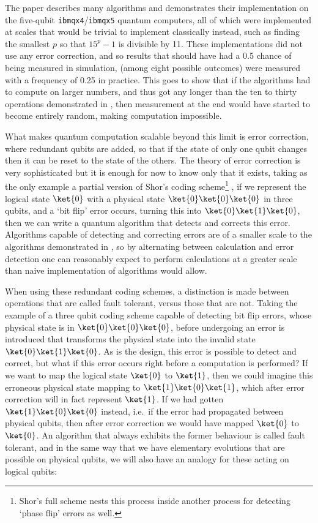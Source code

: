 The paper \cite{algos} describes many algorithms and demonstrates their implementation on the five-qubit \verb`ibmqx4`/\verb`ibmqx5` quantum computers, all of which were implemented at scales that would be trivial to implement classically instead, such as finding the smallest $p$ so that $15^p-1$ is divisible by 11. These implementations did not use any error correction, and so results that should have had a 0.5 chance of being measured in simulation, (among eight possible outcomes) were measured with a frequency of 0.25 in practice. This goes to show that if the algorithms had to compute on larger numbers, and thus got any longer than the ten to thirty operations demonstrated in \cite{algos}, then measurement at the end would have started to become entirely random, making computation impossible.

What makes quantum computation scalable beyond this limit is error correction, where redundant qubits are added, so that if the state of only one qubit changes then it can be reset to the state of the others. The theory of error correction is very sophisticated but it is enough for now to know only that it exists, taking as the only example a partial version of Shor's coding scheme\footnote{Shor's full scheme nests this process inside another process for detecting `phase flip' errors as well.} \cite{shor-encoding}, if we represent the logical state $\ket{0}$ with a physical state $\ket{0}\ket{0}\ket{0}$ in three qubits, and a `bit flip' error occurs, turning this into $\ket{0}\ket{1}\ket{0}$, then we can write a quantum algorithm that detects and corrects this error. Algorithms capable of detecting and correcting errors are of a smaller scale to the algorithms demonstrated in \cite{algos}, so by alternating between calculation and error detection one can reasonably expect to perform calculations at a greater scale than naive implementation of algorithms would allow.

When using these redundant coding schemes, a distinction is made between operations that are called fault tolerant, versus those that are not. Taking the example of a three qubit coding scheme capable of detecting bit flip errors, whose physical state is in $\ket{0}\ket{0}\ket{0}$, before undergoing an error is introduced that transforms the physical state into the invalid state $\ket{0}\ket{1}\ket{0}$. As is the design, this error is possible to detect and correct, but what if this error occurs right before a computation is performed? If we want to map the logical state $\ket{0}$ to $\ket{1}$, then we could imagine this erroneous physical state mapping to $\ket{1}\ket{0}\ket{1}$, which after error correction will in fact represent $\ket{1}$. If we had gotten $\ket{1}\ket{0}\ket{0}$ instead, i.e.\ if the error had propagated between physical qubits, then after error correction we would have mapped $\ket{0}$ to $\ket{0}$. An algorithm that always exhibits the former behaviour is called fault tolerant, and in the same way that we have elementary evolutions that are possible on physical qubits, we will also have an analogy for these acting on logical qubits:

